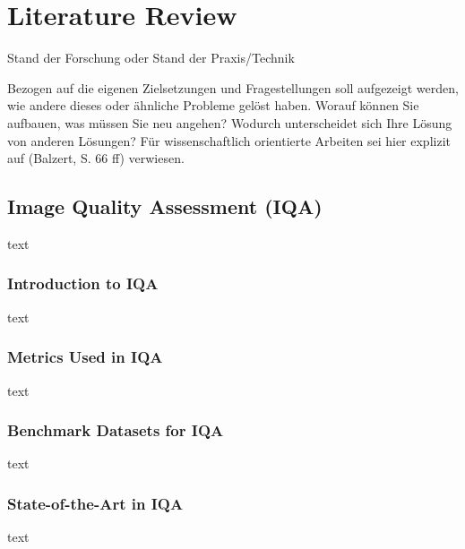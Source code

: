 \chapter{Literature Review}
\label{ch:LiteratureReview}
Stand der Forschung oder Stand der Praxis/Technik

Bezogen auf die eigenen Zielsetzungen und Fragestellungen soll aufgezeigt werden, wie andere dieses oder ähnliche Probleme gelöst haben. Worauf können Sie aufbauen, was müssen Sie neu angehen? Wodurch unterscheidet sich Ihre Lösung von anderen Lösungen? Für wissenschaftlich orientierte Arbeiten sei hier explizit auf (Balzert, S. 66 ff) verwiesen.

\section{Image Quality Assessment (IQA)}
\label{sec:OverviewTeledermatology}
text \par
\vspace{\baselineskip}
\noindent

\subsection{Introduction to IQA}
\label{sub:IntroductionIQA}
text \par
\vspace{\baselineskip}
\noindent

\subsection{Metrics Used in IQA}
\label{sub:MetricsIQA}
text \par
\vspace{\baselineskip}
\noindent

\subsection{Benchmark Datasets for IQA}
\label{sub:BenchmarkDatasetsIQA}
text \par
\vspace{\baselineskip}
\noindent

\subsection{State-of-the-Art in IQA}
\label{sub:SOTA_IQA}
text \par
\vspace{\baselineskip}
\noindent

